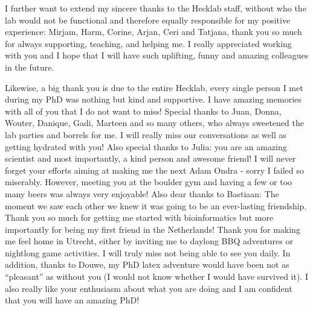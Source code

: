 I further want to extend my sincere thanks to the Hecklab staff, without who the lab would not be functional and therefore equally responsible for my positive experience: Mirjam, Harm, Corine, Arjan, Ceri and Tatjana, thank you so much for always supporting, teaching, and helping me. I really appreciated working with you and I hope that I will have such uplifting, funny and amazing colleagues in the future.

Likewise, a big thank you is due to the entire Hecklab, every single person I met during my PhD was nothing but kind and supportive. I have amazing memories with all of you that I do not want to miss! Special thanks to Juan, Donna, Wouter, Danique, Gadi, Marteen and so many others, who always sweetened the lab parties and borrels for me. I will really miss our conversations as well as getting hydrated with you! Also special thanks to Julia: you are an amazing scientist and most importantly, a kind person and awesome friend! I will never forget your efforts aiming at making me the next Adam Ondra - sorry I failed so miserably. However, meeting you at the boulder gym and having a few or too many beers was always very enjoyable! Also dear thanks to Bastiaan: The moment we saw each other we knew it was going to be an ever-lasting friendship. Thank you so much for getting me started with bioinformatics but more importantly for being my first friend in the Netherlands! Thank you for making me feel home in Utrecht, either by inviting me to daylong BBQ adventures or nightlong game activities. I will truly miss not being able to see you daily. In addition, thanks to Douwe, my PhD latex adventure would have been not as “pleasant” as without you (I would not know whether I would have survived it). I also really like your enthusiasm about what you are doing and I am confident that you will have an amazing PhD!

